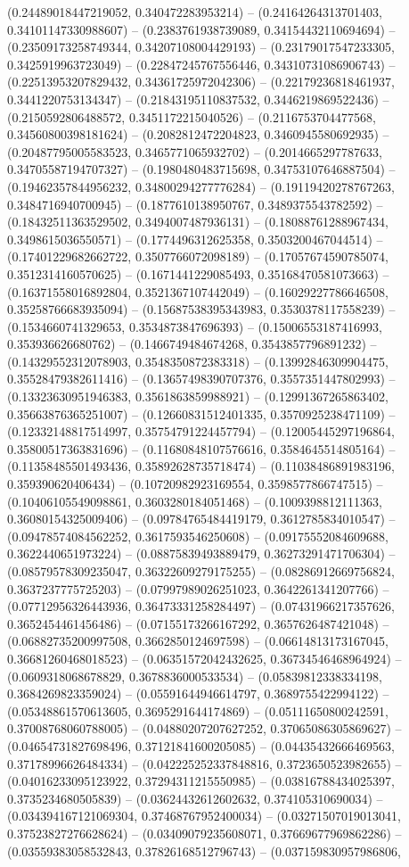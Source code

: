 (0.24489018447219052, 0.340472283953214) -- (0.24164264313701403, 0.34101147330988607) -- (0.2383761938739089, 0.34154432110694694) -- (0.23509173258749344, 0.34207108004429193) -- (0.23179017547233305, 0.3425919963723049) -- (0.22847245767556446, 0.34310731086906743) -- (0.22513953207829432, 0.34361725972042306) -- (0.22179236818461937, 0.3441220753134347) -- (0.21843195110837532, 0.3446219869522436) -- (0.2150592806488572, 0.3451172215040526) -- (0.2116753704477568, 0.34560800398181624) -- (0.2082812472204823, 0.3460945580692935) -- (0.20487795005583523, 0.3465771065932702) -- (0.2014665297787633, 0.34705587194707327) -- (0.1980480483715698, 0.34753107646887504) -- (0.19462357844956232, 0.34800294277776284) -- (0.19119420278767263, 0.3484716940700945) -- (0.1877610138950767, 0.3489375543782592) -- (0.18432511363529502, 0.3494007487936131) -- (0.18088761288967434, 0.3498615036550571) -- (0.1774496312625358, 0.3503200467044514) -- (0.17401229682662722, 0.3507766072098189) -- (0.17057674590785074, 0.3512314160570625) -- (0.1671441229085493, 0.35168470581073663) -- (0.16371558016892804, 0.3521367107442049) -- (0.16029227786646508, 0.35258766683935094) -- (0.15687538395343983, 0.3530378117558239) -- (0.1534660741329653, 0.3534873847696393) -- (0.15006553187416993, 0.353936626680762) -- (0.1466749484674268, 0.3543857796891232) -- (0.14329552312078903, 0.3548350872383318) -- (0.13992846309904475, 0.35528479382611416) -- (0.13657498390707376, 0.3557351447802993) -- (0.13323630951946383, 0.3561863859988921) -- (0.12991367265863402, 0.35663876365251007) -- (0.12660831512401335, 0.3570925238471109) -- (0.12332148817514997, 0.35754791224457794) -- (0.12005445297196864, 0.35800517363831696) -- (0.11680848107576616, 0.3584645514805164) -- (0.11358485501493436, 0.35892628735718474) -- (0.11038486891983196, 0.359390620406434) -- (0.10720982923169554, 0.3598577866747515) -- (0.10406105549098861, 0.3603280184051468) -- (0.1009398812111363, 0.36080154325009406) -- (0.09784765484419179, 0.3612785834010547) -- (0.09478574084562252, 0.3617593546250608) -- (0.09175552084609688, 0.3622440651973224) -- (0.08875839493889479, 0.36273291471706304) -- (0.08579578309235047, 0.36322609279175255) -- (0.08286912669756824, 0.3637237775725203) -- (0.07997989026251023, 0.3642261341207766) -- (0.07712956326443936, 0.36473331258284497) -- (0.07431966217357626, 0.3652454461456486) -- (0.07155173266167292, 0.3657626487421048) -- (0.06882735200997508, 0.3662850124697598) -- (0.06614813173167045, 0.36681260468018523) -- (0.06351572042432625, 0.36734546468964924) -- (0.0609318068678829, 0.3678836000533534) -- (0.05839812338334198, 0.3684269823359024) -- (0.05591644946614797, 0.3689755422994122) -- (0.05348861570613605, 0.3695291644174869) -- (0.05111650800242591, 0.37008768060788005) -- (0.04880207207627252, 0.37065086305869627) -- (0.04654731827698496, 0.37121841600205085) -- (0.04435432666469563, 0.37178996626484334) -- (0.042225252337848816, 0.3723650523982655) -- (0.04016233095123922, 0.37294311215550985) -- (0.03816788434025397, 0.3735234680505839) -- (0.03624432612602632, 0.374105310690034) -- (0.034394167121069304, 0.37468767952400034) -- (0.03271507019013041, 0.37523827276628624) -- (0.03409079235608071, 0.37669677969862286) -- (0.03559383058532843, 0.37826168512796743) -- (0.037159830957986806, 